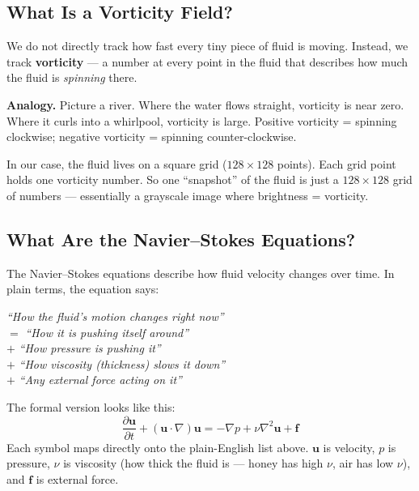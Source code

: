 \documentclass[11pt,twocolumn]{article}
\begin{document}
\subsection{What Is a Vorticity Field?}

We do not directly track how fast every tiny piece of fluid is moving.
Instead, we track \textbf{vorticity} --- a number at every point in the fluid
that describes how much the fluid is \emph{spinning} there.

\begin{analogybox}
\textbf{Analogy.}
Picture a river.
Where the water flows straight, vorticity is near zero.
Where it curls into a whirlpool, vorticity is large.
Positive vorticity = spinning clockwise;
negative vorticity = spinning counter-clockwise.
\end{analogybox}

In our case, the fluid lives on a square grid ($128 \times 128$ points).
Each grid point holds one vorticity number.
So one ``snapshot'' of the fluid is just a $128 \times 128$ grid of numbers ---
essentially a grayscale image where brightness = vorticity.

\subsection{What Are the Navier--Stokes Equations?}

The Navier--Stokes equations describe how fluid velocity changes over time.
In plain terms, the equation says:

\begin{center}
\emph{``How the fluid's motion changes right now''} \\[2pt]
$=$ \emph{``How it is pushing itself around''} \\[2pt]
$+$ \emph{``How pressure is pushing it''} \\[2pt]
$+$ \emph{``How viscosity (thickness) slows it down''} \\[2pt]
$+$ \emph{``Any external force acting on it''}
\end{center}

The formal version looks like this:
\[
  \frac{\partial \mathbf{u}}{\partial t} + (\mathbf{u} \cdot \nabla)\mathbf{u}
  = -\nabla p + \nu \nabla^2 \mathbf{u} + \mathbf{f}
\]
Each symbol maps directly onto the plain-English list above.
$\mathbf{u}$ is velocity, $p$ is pressure, $\nu$ is viscosity (how thick the
fluid is --- honey has high $\nu$, air has low $\nu$), and $\mathbf{f}$ is
external force.
\end{document}
